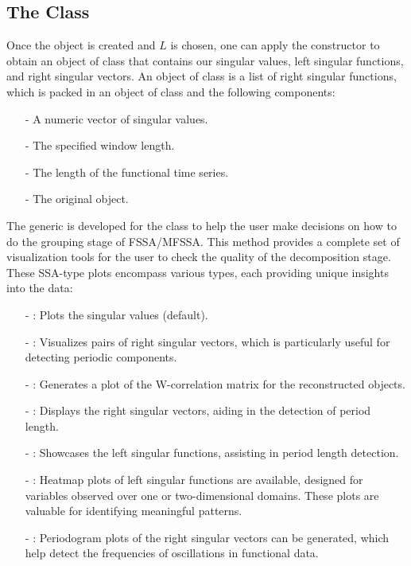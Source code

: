 \subsection{The  Class}\label{subsec:fssa}
Once the  object is created and $L$ is chosen, one can apply the  constructor to obtain an  object of class  that contains our singular values, left singular functions, and right singular vectors. An object of class  is a list of right singular functions, which is packed in an object of class  and the following components:
\begin{itemize}
    \item[-]  A numeric vector of singular values.
    \item[-]  The specified window length.
    \item[-]  The length of the functional time series. 
    \item[-]  The original  object. 
\end{itemize}
The generic  is developed for the  class to help the user make decisions on how to do the grouping stage of FSSA/MFSSA. This method provides a complete set of visualization tools for the user to check the quality of the decomposition stage. These SSA-type plots encompass various types, each providing unique insights into the data:
\begin{itemize}
	\item[-] \textbf{}: Plots the singular values (default).
	\item[-] \textbf{}: Visualizes pairs of right singular vectors, which is particularly useful for detecting periodic components.
	\item[-] \textbf{}: Generates a plot of the W-correlation matrix for the reconstructed objects.
	\item[-] \textbf{}: Displays the right singular vectors, aiding in the detection of period length.
	\item[-] \textbf{}: Showcases the left singular functions, assisting in period length detection.
	\item[-] \textbf{}: Heatmap plots of left singular functions are available, designed for  variables observed over one or two-dimensional domains. These plots are valuable for identifying meaningful patterns.
	\item[-] \textbf{}: Periodogram plots of the right singular vectors can be generated, which help detect the frequencies of oscillations in functional data.
\end{itemize}
